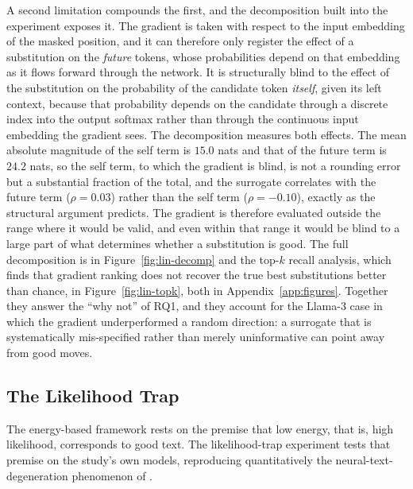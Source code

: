 A second limitation compounds the first, and the decomposition built into the experiment exposes it. The gradient is taken with respect to the input embedding of the masked position, and it can therefore only register the effect of a substitution on the \emph{future} tokens, whose probabilities depend on that embedding as it flows forward through the network. It is structurally blind to the effect of the substitution on the probability of the candidate token \emph{itself}, given its left context, because that probability depends on the candidate through a discrete index into the output softmax rather than through the continuous input embedding the gradient sees. The decomposition measures both effects. The mean absolute magnitude of the self term is $15.0$ nats and that of the future term is $24.2$ nats, so the self term, to which the gradient is blind, is not a rounding error but a substantial fraction of the total, and the surrogate correlates with the future term ($\rho = 0.03$) rather than the self term ($\rho = -0.10$), exactly as the structural argument predicts.
The gradient is therefore evaluated outside the range where it would be valid, and even within that range it would be blind to a large part of what determines whether a substitution is good. The full decomposition is in Figure~\ref{fig:lin-decomp} and the top-$k$ recall analysis, which finds that gradient ranking does not recover the true best substitutions better than chance, in Figure~\ref{fig:lin-topk}, both in Appendix~\ref{app:figures}. Together they answer the ``why not'' of RQ1, and they account for the Llama-3 case in which the gradient underperformed a random direction: a surrogate that is systematically mis-specified rather than merely uninformative can point away from good moves.

\subsection{The Likelihood Trap}
\label{sec:results-trap}

The energy-based framework rests on the premise that low energy, that is, high likelihood, corresponds to good text. The likelihood-trap experiment tests that premise on the study's own models, reproducing quantitatively the neural-text-degeneration phenomenon of \citet{holtzman2020curious}.

